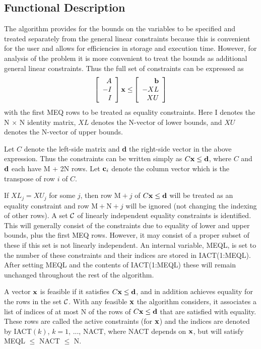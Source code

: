 \documentclass[twoside]{MATH77}
\begin{document}
\subsection{Functional Description}

The algorithm provides for the bounds on the variables to be specified and
treated separately from the general linear constraints because this is
convenient for the user and allows for efficiencies in storage and execution
time. However, for analysis of the problem it is more convenient to treat
the bounds as additional general linear constraints. Thus the full set of
constraints can be expressed as%
\begin{equation*}
\left[
\begin{array}{r}
A \\
-I \\
I
\end{array}
\right] {\bf x\leq }\left[
\begin{array}{r}
{\bf b} \\ -XL \\
XU
\end{array}
\right]
\end{equation*}
with the first MEQ rows to be treated as equality constraints. Here I
denotes the N $\times $ N identity matrix, $XL$ denotes the N-vector of lower
bounds, and $XU$ denotes the N-vector of upper bounds.

Let $C$ denote the left-side matrix and {\bf d} the right-side vector in the
above expression. Thus the constraints can be written simply as $C{\bf x} %
\leq  {\bf d}$, where $C$ and ${\bf d}$ each have M + 2N rows. Let ${\bf c}_i$
denote the column vector which is the transpose of row $i$ of $C$.

If $XL_j = XU_j$ for some $j$, then row $\text{M}+j$ of $C{\bf x}
\leq {\bf d}$ will be treated as an equality constraint and row $\text{M}+
\text{N}+j$ will be ignored (not changing the indexing of
other rows).  A set {${\cal C}$} of linearly independent equality
constraints is identified. This will generally consist of the
constraints due to equality of lower and upper bounds, plus the first
MEQ rows. However, it may consist of a proper subset of these if this
set is not linearly independent. An internal variable, MEQL, is set
to the number of these constraints and their indices are stored in
IACT(1:MEQL). After setting MEQL and the contents of IACT(1:MEQL)
these will remain unchanged throughout the rest of the algorithm.

A vector ${\bf x}$ is feasible if it satisfies $C{\bf x} \leq  {\bf d}$, and
in addition achieves equality for the rows in the set {${\cal C}$}. With any
feasible ${\bf x}$ the algorithm considers, it associates a list of indices of
at most N of the rows of $C{\bf x} \leq  {\bf d}$ that are satisfied with
equality. These rows are called the active constraints (for ${\bf x}$) and the
indices are denoted by IACT$(k)$, $k = 1$, ..., NACT, where NACT depends on
${\bf x}$, but will satisfy MEQL $\leq $ NACT $\leq $ N.
\end{document}
